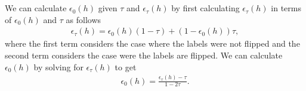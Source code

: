 \documentclass[11pt,a4paper,titlepage]{article}
\begin{document}
\section{}{
\subsection{}{
\quad We can calculate $\epsilon_0(h)$ given $\tau$ and $\epsilon_\tau(h)$ by first calculating $\epsilon_\tau(h)$ in terms of $\epsilon_0(h)$ and $\tau$ as follows
\begin{align*}
	\epsilon_\tau(h) = \epsilon_0(h) (1-\tau) + (1-\epsilon_0(h)) \tau,
\end{align*}
where the first term considers the case where the labels were not flipped and the second term considers the case were the labels are flipped. 
\quad We can calculate $\epsilon_0(h)$ by solving for $\epsilon_\tau(h)$ to get
\begin{align*}
	\epsilon_0(h) = \frac{\epsilon_\tau(h) - \tau}{1-2\tau}.
\end{align*}
}\label{prob:5a}
}
\end{document}
